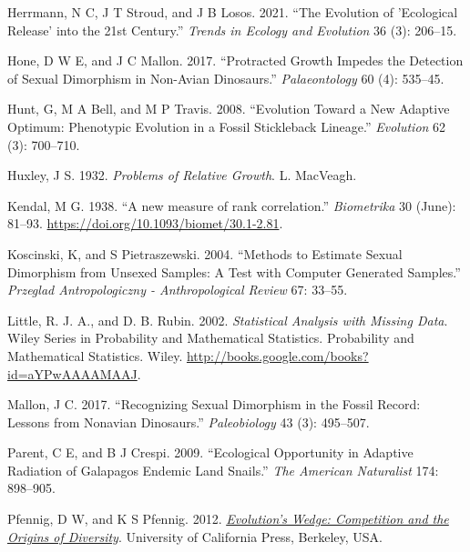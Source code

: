 \documentclass[
  12pt,
]{article}
\newlength{\cslhangindent}
\newlength{\cslentryspacingunit} %
\newenvironment{CSLReferences}[2] %
 {%
  \setlength{\parindent}{0pt}
  \ifodd #1
  \let\oldpar\par
  \def\par{\hangindent=\cslhangindent\oldpar}
  \fi
  \setlength{\parskip}{#2\cslentryspacingunit}
 }%
 {}
\begin{document}
\begin{CSLReferences}{1}{0}
\leavevmode{}%
Herrmann, N C, J T Stroud, and J B Losos. 2021. {``The Evolution of
'Ecological Release' into the 21st Century.''} \emph{Trends in Ecology
and Evolution} 36 (3): 206--15.

\leavevmode{}%
Hone, D W E, and J C Mallon. 2017. {``Protracted Growth Impedes the
Detection of Sexual Dimorphism in Non-Avian Dinosaurs.''}
\emph{Palaeontology} 60 (4): 535--45.

\leavevmode{}%
Hunt, G, M A Bell, and M P Travis. 2008. {``Evolution Toward a New
Adaptive Optimum: Phenotypic Evolution in a Fossil Stickleback
Lineage.''} \emph{Evolution} 62 (3): 700--710.

\leavevmode{}%
Huxley, J S. 1932. \emph{Problems of Relative Growth}. L. MacVeagh.

\leavevmode{}%
Kendal, M G. 1938. {``{A new measure of rank correlation}.''}
\emph{Biometrika} 30 (June): 81--93.
\url{https://doi.org/10.1093/biomet/30.1-2.81}.

\leavevmode{}%
Koscinski, K, and S Pietraszewski. 2004. {``Methods to Estimate Sexual
Dimorphism from Unsexed Samples: A Test with Computer Generated
Samples.''} \emph{Przeglad Antropologiczny - Anthropological Review} 67:
33--55.

\leavevmode{}%
Little, R. J. A., and D. B. Rubin. 2002. \emph{Statistical Analysis with
Missing Data}. Wiley Series in Probability and Mathematical Statistics.
Probability and Mathematical Statistics. Wiley.
\url{http://books.google.com/books?id=aYPwAAAAMAAJ}.

\leavevmode{}%
Mallon, J C. 2017. {``Recognizing Sexual Dimorphism in the Fossil
Record: Lessons from Nonavian Dinosaurs.''} \emph{Paleobiology} 43 (3):
495--507.

\leavevmode{}%
Parent, C E, and B J Crespi. 2009. {``Ecological Opportunity in Adaptive
Radiation of Galapagos Endemic Land Snails.''} \emph{The American
Naturalist} 174: 898--905.

\leavevmode{}%
Pfennig, D W, and K S Pfennig. 2012. \emph{\href{}{Evolution's Wedge:
Competition and the Origins of Diversity}}. University of California
Press, Berkeley, USA.


\end{CSLReferences}
\end{document}
